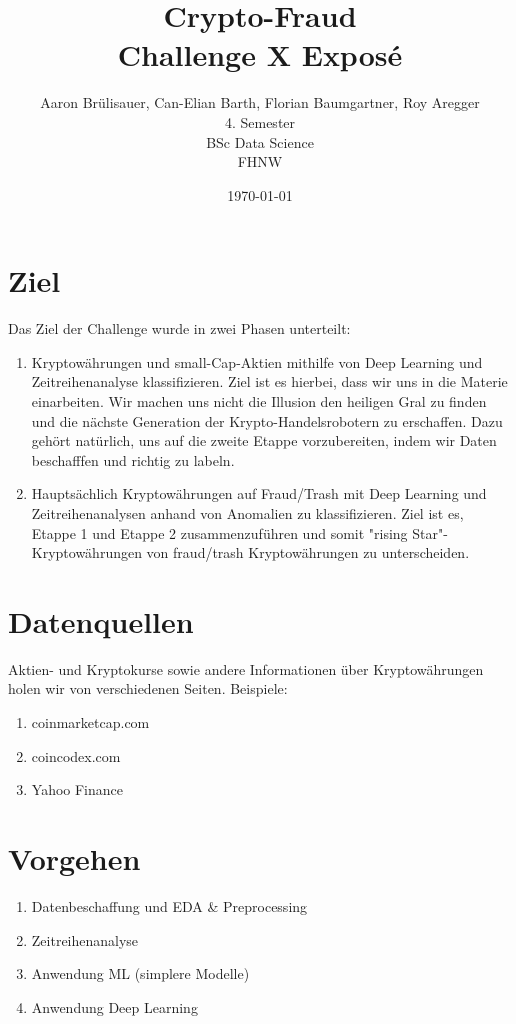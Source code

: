 \documentclass[a4paper,10pt]{article}
\title{Crypto-Fraud\\Challenge X Exposé}
\author{Aaron Brülisauer, Can-Elian Barth, Florian Baumgartner, Roy Aregger\\ 4. Semester \\ BSc Data Science \\ FHNW}
\date{\today}
\begin{document}
\maketitle

\tableofcontents

\section{Ziel}

Das Ziel der Challenge wurde in zwei Phasen unterteilt:

\begin{enumerate}
   \item Kryptowährungen und small-Cap-Aktien mithilfe von Deep Learning und Zeitreihenanalyse klassifizieren. Ziel ist es hierbei, dass wir uns in die Materie einarbeiten. Wir machen uns nicht die Illusion den heiligen Gral zu finden und die nächste Generation der Krypto-Handelsrobotern zu erschaffen. Dazu gehört natürlich, uns auf die zweite Etappe vorzubereiten, indem wir Daten beschafffen und richtig zu labeln.
   \item Hauptsächlich Kryptowährungen auf Fraud/Trash mit Deep Learning und Zeitreihenanalysen anhand von Anomalien zu klassifizieren. Ziel ist es, Etappe 1 und Etappe 2 zusammenzuführen und somit "rising Star"-Kryptowährungen von fraud/trash Kryptowährungen zu unterscheiden.
\end{enumerate}


\section{Datenquellen}

Aktien- und Kryptokurse sowie andere Informationen über Kryptowährungen holen wir von verschiedenen Seiten. Beispiele:

\begin{enumerate}
    \item coinmarketcap.com
    \item coincodex.com
    \item Yahoo Finance
\end{enumerate}

\section{Vorgehen}

\begin{enumerate}
    \item Datenbeschaffung und EDA \& Preprocessing 
    \item Zeitreihenanalyse
    \item Anwendung ML (simplere Modelle)
    \item Anwendung Deep Learning
\end{enumerate}
\end{document}
